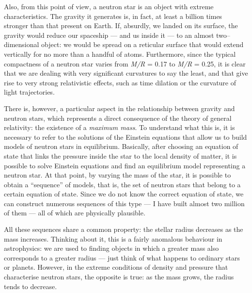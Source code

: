 Also, from this point of view, a neutron star is an object with extreme characteristics.
The gravity it generates is, in fact, at least a billion times stronger than that
present on Earth. If, absurdly, we landed on its surface, the gravity would reduce our
spaceship --- and us inside it --- to an almost two--dimensional object: we would be
spread on a reticular surface that would extend vertically for no more than a handful of
atoms. Furthermore, since the typical compactness
of a neutron star varies from \emph{M/R} = 0.17 to \emph{M/R} = 0.25, it is clear that
we are dealing with very significant curvatures to say the least, and that give rise to
very strong relativistic effects, such as time dilation or the
curvature of light trajectories.

There is, however, a particular aspect in the relationship between gravity and neutron
stars, which represents a direct consequence of the theory of general relativity: the
existence of a \emph{maximum mass}. To understand what this is, it is
necessary to refer to the solutions of the Einstein equations that allow us to build
models of neutron stars in equilibrium. Basically, after choosing an
equation of state that links the pressure inside the star to the
local density of matter, it is possible to solve Einstein equations and find an
equilibrium model representing a neutron star. At that point, by varying the mass of the
star, it is possible to obtain a ``sequence'' of models, that is, the set of neutron
stars that belong to a certain equation of state. Since we do not know the correct
equation of state, we can construct numerous sequences of this type --- I have built
almost two million of them --- all of which are physically plausible.

All these sequences share a common property: the stellar radius decreases as the mass
increases. Thinking about it, this is a fairly anomalous behaviour in astrophysics: we
are used to finding objects in which a greater mass also corresponds to a greater radius
--- just think of what happens to ordinary stars or planets. However, in the extreme
conditions of density and pressure that characterise neutron stars, the opposite is
true: as the mass grows, the radius tends to decrease.

